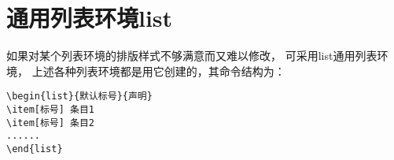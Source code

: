 \section{通用列表环境list}

如果对某个列表环境的排版样式不够满意而又难以修改，
可采用list通用列表环境，%
上述各种列表环境都是用它创建的，其命令结构为：
\begin{verbatim}
\begin{list}{默认标号}{声明}
\item[标号] 条目1
\item[标号] 条目2
......
\end{list}
\end{verbatim}